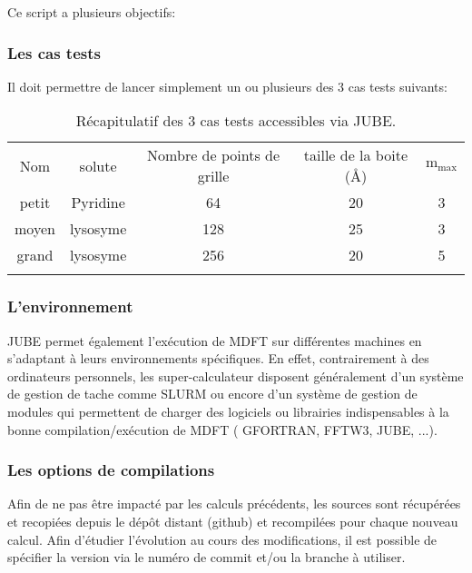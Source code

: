 Ce script a plusieurs objectifs:


\subsubsection{ Les cas tests }
Il doit permettre de lancer simplement un ou plusieurs des 3 cas tests suivants:

\begin{table}[H]
  \begin{center}
    \begin{tabular}{c c c c c }
      \hline & \\[-1em]\hline
      Nom & solute & Nombre de points de grille & taille de la boite (\AA) & $\mathrm{m}_\mathrm{max}$  \\
      \hline
      petit & Pyridine & 64 & 20 & 3  \\
      moyen & lysosyme & 128 & 25 & 3  \\
      grand & lysosyme & 256 & 20 & 5  \\
      \hline & \\[-1em]\hline%
    \end{tabular}
  \end{center}
  \caption{Récapitulatif des 3 cas tests accessibles via JUBE.}
  \label{tab:JUBE_bench_cases}  
\end{table}


\subsubsection{ L'environnement }
JUBE permet également l’exécution de MDFT sur différentes machines en s'adaptant à leurs environnements spécifiques. En effet, contrairement à des ordinateurs personnels, les super-calculateur disposent généralement d'un système de gestion de tache comme SLURM ou encore d'un système de gestion de modules qui permettent de charger des logiciels ou librairies indispensables à la bonne compilation/exécution de MDFT ( GFORTRAN, FFTW3, JUBE, ...).


\subsubsection{ Les options de compilations }
Afin de ne pas être impacté par les calculs précédents, les sources sont récupérées et recopiées depuis le dépôt distant (github) et recompilées pour chaque nouveau calcul. Afin d'étudier l'évolution au cours des modifications, il est possible de spécifier la version via le numéro de commit et/ou la branche à utiliser.

